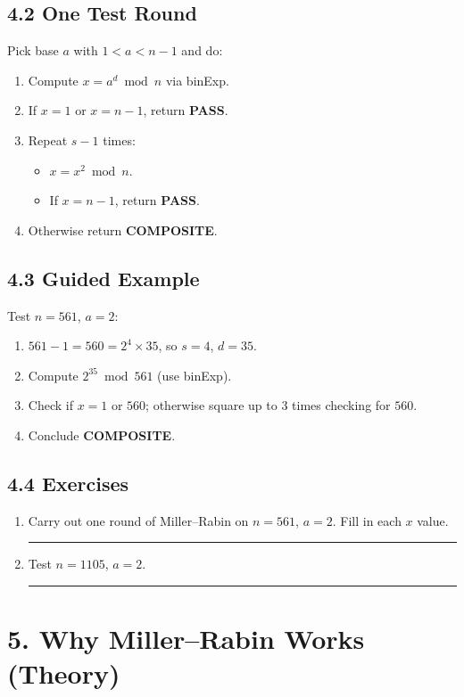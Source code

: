 \documentclass[12pt]{article}
\begin{document}
\subsection{4.2 One Test Round}
Pick base $a$ with $1<a<n-1$ and do:
\begin{enumerate}[label=\arabic*.]
  \item Compute $x=a^d\bmod n$ via binExp.
  \item If $x=1$ or $x=n-1$, return \textbf{PASS}.
  \item Repeat $s-1$ times:
    \begin{itemize}
      \item $x = x^2\bmod n$.
      \item If $x=n-1$, return \textbf{PASS}.
    \end{itemize}
  \item Otherwise return \textbf{COMPOSITE}.
\end{enumerate}

\subsection{4.3 Guided Example}
Test $n=561$, $a=2$:
\begin{enumerate}[label=\arabic*.]
  \item $561-1=560=2^4\times35$, so $s=4$, $d=35$.
  \item Compute $2^{35}\bmod561$ (use binExp).
  \item Check if $x=1$ or $560$; otherwise square up to 3 times checking for $560$.  
  \item Conclude \textbf{COMPOSITE}.  
\end{enumerate}

\subsection{4.4 Exercises}
\begin{enumerate}[label=Exercise 4.\arabic*]
  \item Carry out one round of Miller--Rabin on $n=561$, $a=2$. Fill in each $x$ value.\rule{6cm}{0.4pt}
  \item Test $n=1105$, $a=2$.\rule{6cm}{0.4pt}
\end{enumerate}

\section{5. Why Miller--Rabin Works (Theory)}
\end{document}
